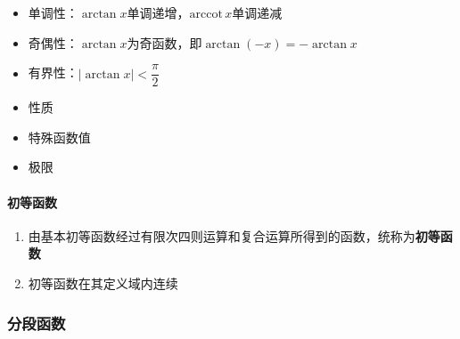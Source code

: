 \documentclass[../book.tex]{subfiles}
\begin{document}
\begin{enumerate}
\begin{itemize}
            \item 单调性：$\arctan x$单调递增，$\mathrm{arccot}\, x$单调递减
            \item 奇偶性：$\arctan x$为奇函数，即$\arctan(-x) = -\arctan x$
            \item 有界性：$|\arctan x| < \dfrac{\pi}{2}$
            \item 性质
            \item 特殊函数值
            \item 极限
        \end{itemize}
    \end{enumerate}

    \paragraph{初等函数}
    \begin{enumerate}
        \item 由基本初等函数经过有限次四则运算和复合运算所得到的函数，统称为\textbf{初等函数}
        \item 初等函数在其定义域内连续
    \end{enumerate}

    \subsubsection{分段函数}
\end{document}
